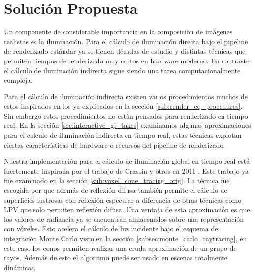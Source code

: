 \chapter{Solución Propuesta}
\label{chap:proposal}

Un componente de considerable importancia en la composición de imágenes realistas es la iluminación. Para el cálculo de iluminación directa bajo el pipeline de renderizado estándar ya se tienen décadas de estudio y distintas técnicas que permiten tiempos de renderizado muy cortos en hardware moderno. En contraste el cálculo de iluminación indirecta sigue siendo una tarea computacionalmente compleja. 

Para el cálculo de iluminación indirecta existen varios procedimientos muchos de estos inspirados en los ya explicados en la sección \ref{sub:render_eq_procedures}. Sin embargo estos procedimientos no están pensados para renderizado en tiempo real. En la sección \ref{sec:interactive_gi_takes} examinamos algunas aproximaciones para el cálculo de iluminación indirecta en tiempo real, estas técnicas explotan ciertas características de hardware o recursos del pipeline de renderizado.

Nuestra implementación para el cálculo de iluminación global en tiempo real está fuertemente inspirada por el trabajo de Crassin y otros en 2011 \cite{CNSGE11b}. Este trabajo ya fue examinado en la sección \ref{sub:voxel_cone_tracing_orig}. La técnica fue escogida por que además de reflexión difusa también permite el cálculo de superficies lustrosas con reflexión especular a diferencia de otras técnicas como \ac{LPV} que solo permiten reflexión difusa. Una ventaja de esta aproximación es que los valores de radiancia ya se encuentran almacenados sobre una representación con vóxeles. Esto acelera el cálculo de luz incidente bajo el esquema de integración Monte Carlo visto en la sección \ref{subsec:monte_carlo_raytracing}, en este caso los conos permiten realizar una cruda aproximación de un grupo de rayos. Además de esto el algoritmo puede ser usado en escenas totalmente dinámicas.







